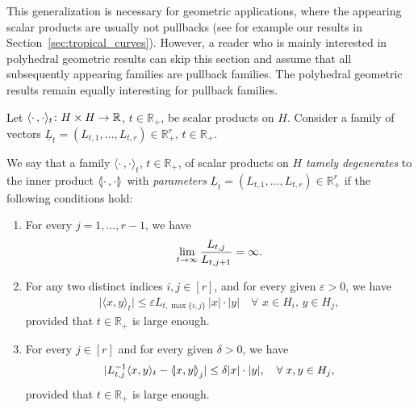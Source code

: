 \documentclass[AHL,Unicode,longabstracts]{cedram}
\newcommand{\innone}[2]{{\langle#2\rangle_{#1}}}
\newcommand{\llangle}{\mathopen{\langle\mkern -3.1mu\lvert}}
\newcommand{\rrangle}{\mathclose{\rvert\mkern -3.1mu\rangle}}
\newcommand{\highinn}[2]{{\llangle#2\rrangle_{#1}}}
\newcommand{\refnorm}[1]{\lvert#1\rvert}
\newcommand{\abs}[1]{\lvert #1\rvert}
\newcommand{\R}{\mathbb{R}}
\renewcommand*{\to}{\mathchoice{\longrightarrow}{\rightarrow}{\rightarrow}{\rightarrow}}
\newcommand*{\relabel}{\renewcommand{\labelenumi}{(\theenumi)}}
\newcommand*{\alphenumi}{\renewcommand*{\theenumi}{\alph{enumi}}\relabel}
\let\oldforall\forall
\renewcommand*{\forall}{\mathrel{\oldforall}}
\begin{document}
This generalization is necessary for geometric applications, where the appearing scalar products are usually not pullbacks (see for example our results in Section~\ref{sec:tropical_curves}). However, a reader who is mainly interested in polyhedral geometric results can skip this section and assume that all subsequently appearing families are pullback families. The polyhedral geometric results remain equally interesting for pullback families.


Let $\innone{t}{\cdot\,, \cdot} \colon H \times H \to \R$, $t\in \R_+$, be scalar products on $H$. Consider a family of vectors $\underline L_t = (L_{t,1}, \dots, L_{t,r}) \in \R_+^r$, $t\in \R_+$.

\begin{defi} \label{def:TameDegenerations}
We say that a family $\innone{t}{\cdot\,, \cdot}$, $t\in \R_+$, of scalar products on $H$ \emph{tamely degenerates} to the inner product $\highinn{}{\cdot\,, \cdot}$ with \emph{parameters} $\underline L_t = (L_{t,1}, \dots, L_{t,r})\in \R_+^r$ if the following conditions hold:
\begin{enumerate}\alphenumi
\item \label{item:tame-a}
For every $j =1, \dots, r-1$, we have
\begin{equation}\label{eq:abstract_tame0}
\lim_{t \to \infty} \frac{L_{t,j}}{L_{t,j+1}} = \infty.
\end{equation}
\item \label{item:tame-b}


For any two distinct indices $i, j \in [r]$, and for every given $\varepsilon>0$, we have
\begin{align}\label{eq:abstract_tame1}
\abs{\innone{t}{x,y}} \le \varepsilon L_{t,\max\{i,j\}}\, \refnorm{x}\cdot\refnorm{y} \quad \forall\,\, x \in H_i, \, y \in H_j,
\end{align}
provided that $t\in \R_+$ is large enough.
\item \label{item:tame-c}
For every $j \in [r]$ and for every given $\delta >0$, we have
\begin{align}\label{eq:abstract_tame2}
\abs{L_{t,j}^{-1} \innone{t}{x, y} - \highinn{j}{x, y}} \le \delta \refnorm{x}\cdot\refnorm{y}, \quad \forall x,y \in H_j,
\end{align}
provided that $t\in \R_+$ is large enough. %
\end{enumerate}
\end{defi}
\end{document}

